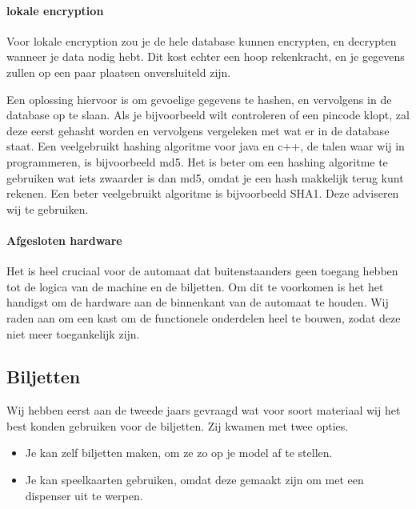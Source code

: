 \documentclass{article}
\begin{document}
\paragraph{lokale encryption}

Voor lokale encryption zou je de hele database kunnen encrypten, en decrypten wanneer je data nodig hebt.
Dit kost echter een hoop rekenkracht, en je gegevens zullen op een paar plaatsen onversluiteld zijn.

Een oplossing hiervoor is om gevoelige gegevens te hashen, en vervolgens in de database op te slaan.
Als je bijvoorbeeld wilt controleren of een pincode klopt, zal deze eerst gehasht worden en vervolgens vergeleken met wat er in de database staat.
Een veelgebruikt hashing algoritme voor java en c++, de talen waar wij in programmeren, is bijvoorbeeld md5.
Het is beter om een hashing algoritme te gebruiken wat iets zwaarder is dan md5, omdat je een hash makkelijk terug kunt rekenen.
Een beter veelgebruikt algoritme is bijvoorbeeld SHA1.
Deze adviseren wij te gebruiken.

\hfill

\centerline{  }

\paragraph{Afgesloten hardware}

Het is heel cruciaal voor de automaat dat buitenstaanders geen toegang hebben tot de logica van de machine en de biljetten.
Om dit te voorkomen is het het handigst om de hardware aan de binnenkant van de automaat te houden.
Wij raden aan om een kast om de functionele onderdelen heel te bouwen, zodat deze niet meer toegankelijk zijn.

\subsection{Biljetten}

Wij hebben eerst aan de tweede jaars gevraagd wat voor soort materiaal wij het best konden gebruiken voor de biljetten.
Zij kwamen met twee opties.
\begin{itemize}
\item Je kan zelf biljetten maken, om ze zo op je model af te stellen.
\item Je kan speelkaarten gebruiken, omdat deze gemaakt zijn om met een dispenser uit te werpen.
\end{itemize}
\end{document}
